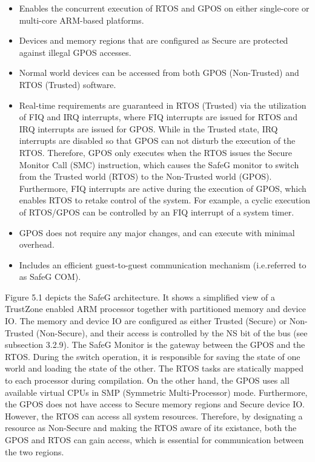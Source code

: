\begin{itemize}
\item Enables the concurrent execution of RTOS and GPOS on either single-core or multi-core ARM-based platforms.

\item Devices and memory regions that are configured as Secure are protected against illegal GPOS accesses.

\item Normal world devices can be accessed from both GPOS (Non-Trusted) and RTOS (Trusted) software.

\item Real-time requirements are guaranteed in RTOS (Trusted) via the utilization of FIQ and IRQ interrupts, where FIQ interrupts are issued for RTOS and IRQ interrupts are issued for GPOS. While in the Trusted state, IRQ interrupts are disabled so that GPOS can not disturb the execution of the RTOS. Therefore, GPOS only executes when the RTOS issues the Secure Monitor Call (SMC) instruction, which causes the SafeG monitor to switch from the Trusted world (RTOS) to the Non-Trusted world (GPOS). Furthermore, FIQ interrupts are active during the execution of GPOS, which enables RTOS to retake control of the system. For example, a cyclic execution of RTOS/GPOS can be controlled by an FIQ interrupt of a system timer.

\item GPOS does not require any major changes, and can execute with minimal overhead.

\item Includes an efficient guest-to-guest communication mechanism (i.e.referred to as SafeG COM).
\end{itemize}


Figure 5.1 depicts the SafeG architecture. It shows a simplified view of a TrustZone enabled ARM processor together with partitioned memory and device IO. The memory and device IO are configured as either Trusted (Secure) or Non-Trusted (Non-Secure), and their access is controlled by the NS bit of the bus (see subsection 3.2.9). The SafeG Monitor is the gateway between the GPOS and the RTOS. During the switch operation, it is responsible for saving the state of one world and loading the state of the other. The RTOS tasks are statically mapped to each processor during compilation. On the other hand, the GPOS uses all available virtual CPUs in SMP (Symmetric Multi-Processor) mode. Furthermore, the GPOS does not have access to Secure memory regions and Secure device IO. However, the RTOS can access all system resources. Therefore, by designating a resource as Non-Secure and making the RTOS aware of its existance, both the GPOS and RTOS can gain access, which is essential for communication between the two regions.

